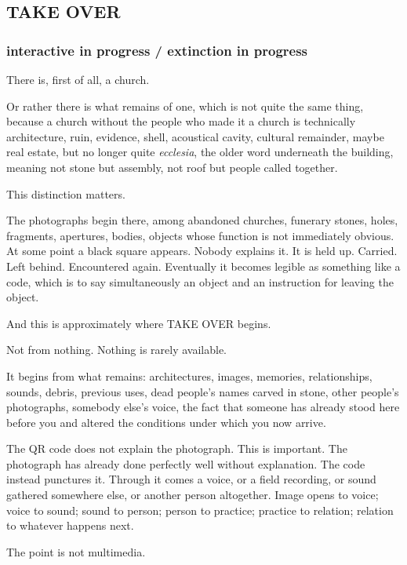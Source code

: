 \subsection{TAKE OVER}\label{take-over}

\subsubsection{interactive in progress / extinction in
progress}\label{interactive-in-progress-extinction-in-progress}

There is, first of all, a church.

Or rather there is what remains of one, which is not quite the same
thing, because a church without the people who made it a church is
technically architecture, ruin, evidence, shell, acoustical cavity,
cultural remainder, maybe real estate, but no longer quite
\emph{ecclesia}, the older word underneath the building, meaning not
stone but assembly, not roof but people called together.

This distinction matters.

The photographs begin there, among abandoned churches, funerary stones,
holes, fragments, apertures, bodies, objects whose function is not
immediately obvious. At some point a black square appears. Nobody
explains it. It is held up. Carried. Left behind. Encountered again.
Eventually it becomes legible as something like a code, which is to say
simultaneously an object and an instruction for leaving the object.

And this is approximately where TAKE OVER begins.

Not from nothing. Nothing is rarely available.

It begins from what remains: architectures, images, memories,
relationships, sounds, debris, previous uses, dead people's names carved
in stone, other people's photographs, somebody else's voice, the fact
that someone has already stood here before you and altered the
conditions under which you now arrive.

The QR code does not explain the photograph. This is important. The
photograph has already done perfectly well without explanation. The code
instead punctures it. Through it comes a voice, or a field recording, or
sound gathered somewhere else, or another person altogether. Image opens
to voice; voice to sound; sound to person; person to practice; practice
to relation; relation to whatever happens next.

The point is not multimedia.

